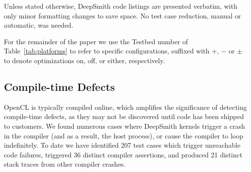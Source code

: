 
Unless stated otherwise, DeepSmith code listings are presented verbatim, with only minor formatting changes to save space. No test case reduction, manual or automatic, was needed.


For the remainder of the paper we use the Testbed number of Table~\ref{tab:platforms} to refer to specific configurations, suffixed with $+$, $-$ or $\pm$ to denote optimizations on, off, or either, respectively.

\subsection{Compile-time Defects}%
\label{subsec:compile-time-defects}

OpenCL is typically compiled online, which amplifies the significance of detecting compile-time defects, as they may not be discovered until code has been shipped to customers. We found numerous cases where DeepSmith kernels trigger a crash in the compiler (and as a result, the host process), or cause the compiler to loop indefinitely. To date we have identified 207 test cases which trigger unreachable code failures, triggered 36 distinct compiler assertions, and produced 21 distinct stack traces from other compiler crashes.

